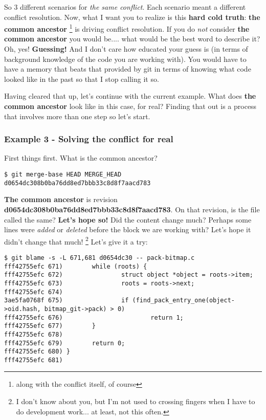 So 3 different scenarios for {\it the same conflict}. Each scenario meant a different conflict resolution. Now, what I want you
to realize is this {\bf hard cold truth}: {\bf the common ancestor} \footnote{along with the conflict itself, of course} is driving
conflict resolution. If you do {\it not} consider {\bf the common ancestor} you would be.... what would be the best word to describe
it? Oh, yes! {\bf Guessing!} And I don't care how educated your guess is (in terms of background knowledge of the code you are
working with). You would have to have a memory that beats that provided by git in terms of knowing what code looked like in the past
so that I stop calling it so.

Having cleared that up, let's continue with the current example. What does {\bf the common ancestor} look like in this case,
for real? Finding that out is a process that involves more than one step so let's start.

\subsubsection{Example 3 - Solving the conflict for real}
First things first. What is the common ancestor?

\begin{lstlisting}[style=console_style, caption={\bf example 3} - finging common ancestor]
$ git merge-base HEAD MERGE_HEAD
d0654dc308b0ba76dd8ed7bbb33c8d8f7aacd783
\end{lstlisting}

{\bf The common ancestor} is revision {\bf d0654dc308b0ba76dd8ed7bbb33c8d8f7aacd783}. On that revision, is the file called the same?
{\bf Let's hope so!} Did the content change much? Perhaps some lines were {\it added} or {\it deleted} before the block we are working
with? Let's hope it didn't change that much! \footnote {I don't know about you, but I'm not used to crossing fingers
when I have to do development work... at least, not this often.} Let's give it a try:

\begin{lstlisting}[style=console_style, basicstyle=\small, caption={\bf example 3} - checking ancestor code]
$ git blame -s -L 671,681 d0654dc30 -- pack-bitmap.c
fff42755efc 671)        while (roots) {
fff42755efc 672)                struct object *object = roots->item;
fff42755efc 673)                roots = roots->next;
fff42755efc 674) 
3ae5fa0768f 675)                if (find_pack_entry_one(object->oid.hash, bitmap_git->pack) > 0)
fff42755efc 676)                        return 1;
fff42755efc 677)        }
fff42755efc 678) 
fff42755efc 679)        return 0;
fff42755efc 680) }
fff42755efc 681)
\end{lstlisting}

